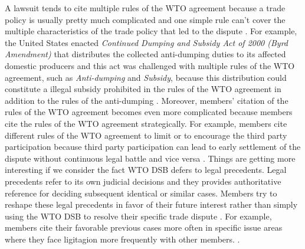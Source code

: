 A lawsuit tends to cite multiple rules of the WTO agreement because a trade policy is usually pretty much complicated
and one simple rule can't cover the multiple characteristics of the trade policy that led to the dispute \citep{palmeter2004dispute}.
For example, the United States enacted \textit{Continued Dumping and Subsidy Act of 2000 (Byrd Amendment)} that distributes
the collected anti-dumping duties to its affected domestic producers and this act was challenged with multiple rules of the WTO agreement,
such as \textit{Anti-dumping} and \textit{Subsidy}, because
this distribution could constitute a illegal subsidy prohibited
in the rules of the WTO agreement in addition to the rules of the anti-dumping \citep{cdsoa}.
Moreover, members' citation of the rules of the WTO agreement becomes even more complicated because members cite the
rules of the WTO agreement strategically. For example,
members cite different rules of the WTO agreement to limit or to encourage
the third party participation because third party
participation can lead to early settlement of the dispute without continuous
legal battle and vice versa  \cite{who_gets}.
Things are getting more interesting
if we consider the fact WTO DSB defers to legal precedents.
Legal precedents refer to its own judicial decisions
and they provides authoritative reference
for deciding subsequent identical or similar cases.
Members try to reshape these legal precedents
in favor of their future interest rather than
simply using the WTO DSB to resolve their specific trade
dispute \citep{pelc}. For example,
members cite their
favorable previous cases more often in specific
issue areas where they face ligitagion more frequently with other members.
\citep{latent}.
 
 
